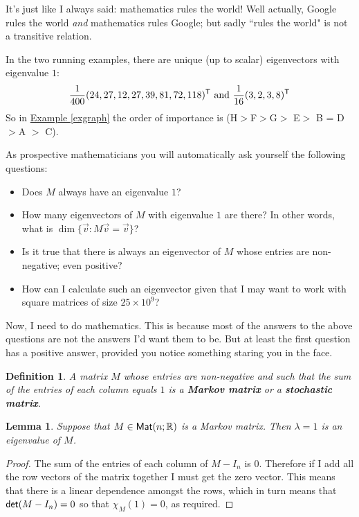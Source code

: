 \documentclass[11pt]{amsbook}
\newtheorem{definition}[theorem]{Definition}
\newtheorem{lemma}[theorem]{Lemma}
\theoremstyle{definition}
\begin{document}
It's just like I always said: mathematics rules the world! Well actually, Google rules the world {\it and} mathematics rules Google; but sadly ``rules the world" is not a transitive relation.

In the two running examples, there are unique (up to scalar) eigenvectors with eigenvalue $1$: $$\frac{1}{400}(24, 27, 12, 27, 39, 81, 72, 118)^{\sf T} \text{ and } \frac{1}{16}(3, 2, 3, 8)^{\sf T}$$ So in \hyperref[exgraph]{Example \ref{exgraph}} the order of importance is (H$>$F$>$G$>$ E$>$ B = D $>$A $>$ C).
\medskip

\label{prospective}
As prospective mathematicians you will automatically ask yourself the following questions:
\begin{itemize}
\item Does $M$ always have an eigenvalue $1$?
\item How many eigenvectors of $M$ with eigenvalue $1$ are there? In other words, what is $\dim \{ \vec{v}: M \vec{v } = \vec{v}\}$?
\item Is it true that there is always an eigenvector of $M$ whose entries are non-negative; even positive? \item How can I calculate such an eigenvector given that I may want to work with square matrices of size $25\times 10^9$?
\end{itemize}

Now, I need to do mathematics. This is because most of the answers to the above questions are not the answers I'd want them to be. But at least the first question has a positive answer, provided you notice something staring you in the face.

\begin{definition} A matrix $M$ whose entries are non-negative and such that the sum of the entries of each column equals $1$ is a {\bf Markov matrix} or a {\bf stochastic matrix}.
\end{definition}

\begin{lemma} Suppose that $M\in {\sf Mat}(n; \mathbb{R})$ is a Markov matrix. Then $\lambda = 1$ is an eigenvalue of $M$. \end{lemma}
\begin{proof}
The sum of the entries of each column of $M - I_n$ is $0$. Therefore if I add all the row vectors of the matrix together I must get the zero vector. This means that there is a linear dependence amongst the rows, which in turn means that ${\sf det}(M - I_n) = 0$ so that $\chi_M(1) = 0$, as required.
\end{proof}
\end{document}

